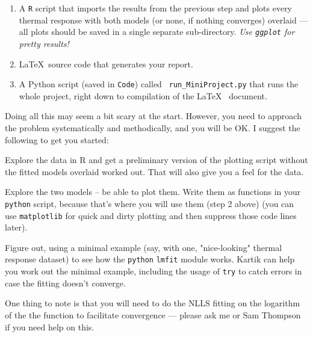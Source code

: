 \begin{enumerate}
\begin{compactitem}
		\end{compactitem}

	\item A {\tt R} script that imports the results from the previous 
	step and plots every thermal response with both models (or none, if 
	nothing converges) overlaid --- all plots should be saved in a 
	single separate sub-directory. {\it Use {\tt ggplot} for pretty 
	results!} 

	\item \LaTeX~source code that generates your report.
	
	\item A Python script (saved in {\tt Code}) called {\tt 
	run\_MiniProject.py} that runs the whole project, right down to 
	compilation of the \LaTeX~ document. 

\end{enumerate}

Doing all this may seem a bit scary at the start. However, you need to 
approach the problem systematically and methodically, and you will be 
OK. I suggest the following to get you started:

\begin{compactitem}

	\item Explore the data in R and get a preliminary version of the 
	plotting script without the fitted models overlaid worked out. That 
	will also give you a feel for the data.

	\item Explore the two models -- be able to plot them. Write them as 
	functions in your {\tt python} script, because that's where you 
	will use them (step 2 above) (you can use {\tt matplotlib} for 
	quick and dirty plotting and then suppress those code lines later).

	\item Figure out, using a minimal example (say, with one, 
	"nice-looking" thermal response dataset) to see how the {\tt python}
	{\tt lmfit} module works. Kartik can help you work out the minimal
	example, including the usage of {\tt try} to catch errors in case the
	fitting doesn't converge. 
	
	\item One thing to note is that you will need to do the NLLS fitting 
	on the logarithm of the the function to facilitate convergence --- 
	please ask me or Sam Thompson if you need help on this.
	
\end{compactitem}

